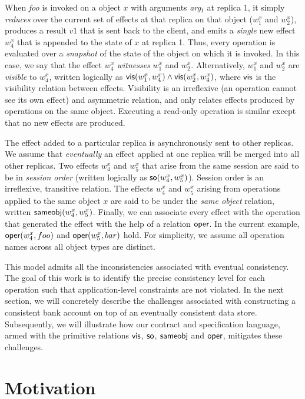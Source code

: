 When \emph{foo} is invoked on a object $x$ with arguments \emph{arg}$_1$ at
replica 1, it simply \emph{reduces} over the current set of effects at that
replica on that object ($w^x_1$ and $w^x_2$), produces a result $v1$ that is
sent back to the client, and emits a \emph{single} new effect $w^x_4$ that is
appended to the state of $x$ at replica 1. Thus, every operation is evaluated
over a \emph{snapshot} of the state of the object on which it is invoked. In
this case, we say that the effect $w^x_4$ \emph{witnesses} $w^x_1$ and $w^x_2$.
Alternatively, $w^x_1$ and $w^x_2$ are \emph{visible} to $w^x_4$, written
logically as ${\normalfont \textsf{vis}(w^x_1,w^x_4)} \wedge {\normalfont \textsf{vis}(w^x_2,w^x_4)}$, where ${\normalfont \textsf{vis}}$ is
the visibility relation between effects. Visibility is an irreflexive (an
operation cannot see its own effect) and asymmetric relation, and only relates
effects produced by operations on the same object. Executing a read-only
operation is similar except that no new effects are produced.

The effect added to a particular replica is asynchronously sent to other
replicas. We assume that \emph{eventually} an effect applied at one replica
will be merged into all other replicas. Two effects $w^x_4$ and $w^x_5$ that
arise from the same session are said to be in \emph{session order} (written
logically as ${\normalfont \textsf{so}(w^x_4,w^x_5)}$). Session order is an irreflexive, transitive
relation. The effects $w^x_4$ and $w^x_5$ arising from operations applied to
the same object $x$ are said to be under the \emph{same object} relation,
written ${\normalfont \textsf{sameobj}(w^x_4,w^x_5)}$. Finally, we can associate every effect with
the operation that generated the effect with the help of a relation ${\normalfont \textsf{oper}}$.
In the current example, ${\normalfont \textsf{oper}(w^x_4,foo)}$ and ${\normalfont \textsf{oper}(w^x_5,bar)}$ hold. For
simplicity, we assume all operation names across all object types are distinct.

This model admits all the inconsistencies associated with eventual consistency.
The goal of this work is to identify the precise consistency level for each
operation such that application-level constraints are not violated. In the next
section, we will concretely describe the challenges associated with
constructing a consistent bank account on top of an eventually consistent data
store. Subsequently, we will illustrate how our contract and specification
language, armed with the primitive relations ${\normalfont \textsf{vis}}$, ${\normalfont \textsf{so}}$, ${\normalfont \textsf{sameobj}}$ and
${\normalfont \textsf{oper}}$, mitigates these challenges.

\section{Motivation}
\label{sec:motivation}

